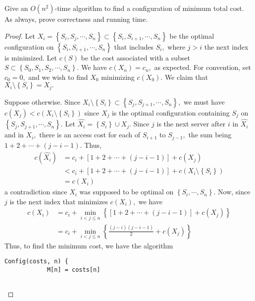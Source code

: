 \documentclass{article}
\begin{document}
Give an $O(n^2)$-time algorithm to find a configuration of minimum total cost.  As always, prove correctness and running time.  
\begin{proof}
	Let $X_i=\left\{ S_i, S_j, \cdots, S_n \right\}\subset \left\{ S_i, S_{i+1}, \cdots, S_n \right\}$ be the optimal configuration on $\left\{ S_i, S_{i+1}, \cdots, S_{n} \right\}$ that includes $S_i,$ where $j>i$ the next index is minimized. Let $c(S)$ be the cost associated with a subset $S\subset\left\{ S_0, S_1, S_2, \cdots, S_n \right\}.$ We have $c(X_n) = c_n,$ as expected. For convention, set $c_0=0,$ and we wish to find $X_0$ minimizing $c(X_0).$ We claim that $X_i\setminus\left\{ S_i \right\}=X_j.$

	Suppose otherwise. Since $X_i\setminus\left\{ S_i \right\}\subset \left\{ S_j, S_{j+1}, \cdots, S_n \right\},$ we must have $c(X_j)<c\left( X_i\setminus\left\{ S_i \right\} \right)$ since $X_j$ is the optimal configuration containing $S_j$ on $\left\{ S_j, S_{j+1}, \cdots, S_n \right\}.$ Let $\hat{X_i}=\left\{ S_i \right\}\cup X_j.$ Since $j$ is the next server after $i$ in $\hat{X_i}$ and in $X_i,$ there is an access cost for each of $S_{i+1}$ to $S_{j-1},$ the sum being $1+2+\cdots+(j-i-1).$ Thus,
	\begin{align*}
		c(\hat{X_i}) &= c_i + \left[ 1+2+\cdots+(j-i-1) \right] + c(X_j) \\
		&< c_i + [1+2+\cdots+(j-i-1)] + c\left( X_i\setminus\left\{ S_i \right\} \right) \\
		&= c(X_i)
	\end{align*}
	a contradiction since $X_i$ was supposed to be optimal on $\left\{ S_i, \cdots, S_n \right\}.$ Now, since $j$ is the next index that minimizes $c(X_i),$ we have
	\begin{align*}
		c(X_i) &= c_i + \min_{i<j\le n}\left\{\left[ 1+2+\cdots+(j-i-1) \right] + c(X_j)\right\} \\
		&= c_i + \min_{i<j\le n}\left\{ \frac{(j-i)(j-i-1)}{2} + c(X_j) \right\}\tag{1}
	\end{align*}
	Thus, to find the minimum cost, we have the algorithm
	\begin{Verbatim}[tabsize=4]
		Config(costs, n) {
			M[n] = costs[n]


\end{Verbatim}
\end{proof}
\end{document}
